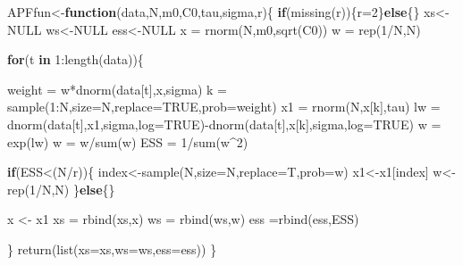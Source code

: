 \documentclass[
]{article}
\newenvironment{Shaded}{\begin{snugshade}}{\end{snugshade}}
\newcommand{\AttributeTok}[1]{\textcolor[rgb]{0.77,0.63,0.00}{#1}}
\newcommand{\ConstantTok}[1]{\textcolor[rgb]{0.00,0.00,0.00}{#1}}
\newcommand{\ControlFlowTok}[1]{\textcolor[rgb]{0.13,0.29,0.53}{\textbf{#1}}}
\newcommand{\DecValTok}[1]{\textcolor[rgb]{0.00,0.00,0.81}{#1}}
\newcommand{\FunctionTok}[1]{\textcolor[rgb]{0.00,0.00,0.00}{#1}}
\newcommand{\NormalTok}[1]{#1}
\newcommand{\OtherTok}[1]{\textcolor[rgb]{0.56,0.35,0.01}{#1}}
\newcommand{\SpecialCharTok}[1]{\textcolor[rgb]{0.00,0.00,0.00}{#1}}
\begin{document}
\begin{Shaded}
\begin{Highlighting}[]
\NormalTok{APFfun}\OtherTok{\textless{}{-}}\ControlFlowTok{function}\NormalTok{(data,N,m0,C0,tau,sigma,r)\{}
  \ControlFlowTok{if}\NormalTok{(}\FunctionTok{missing}\NormalTok{(r))\{r}\OtherTok{=}\DecValTok{2}\NormalTok{\}}\ControlFlowTok{else}\NormalTok{\{\}}
\NormalTok{  xs}\OtherTok{\textless{}{-}}\ConstantTok{NULL}
\NormalTok{  ws}\OtherTok{\textless{}{-}}\ConstantTok{NULL}
\NormalTok{  ess}\OtherTok{\textless{}{-}}\ConstantTok{NULL}
\NormalTok{  x  }\OtherTok{=} \FunctionTok{rnorm}\NormalTok{(N,m0,}\FunctionTok{sqrt}\NormalTok{(C0))}
\NormalTok{  w  }\OtherTok{=} \FunctionTok{rep}\NormalTok{(}\DecValTok{1}\SpecialCharTok{/}\NormalTok{N,N)}
  
  \ControlFlowTok{for}\NormalTok{(t }\ControlFlowTok{in} \DecValTok{1}\SpecialCharTok{:}\FunctionTok{length}\NormalTok{(data))\{}
    
\NormalTok{    weight }\OtherTok{=}\NormalTok{ w}\SpecialCharTok{*}\FunctionTok{dnorm}\NormalTok{(data[t],x,sigma)}
\NormalTok{    k   }\OtherTok{=} \FunctionTok{sample}\NormalTok{(}\DecValTok{1}\SpecialCharTok{:}\NormalTok{N,}\AttributeTok{size=}\NormalTok{N,}\AttributeTok{replace=}\ConstantTok{TRUE}\NormalTok{,}\AttributeTok{prob=}\NormalTok{weight)}
\NormalTok{    x1   }\OtherTok{=} \FunctionTok{rnorm}\NormalTok{(N,x[k],tau)}
\NormalTok{    lw  }\OtherTok{=} \FunctionTok{dnorm}\NormalTok{(data[t],x1,sigma,}\AttributeTok{log=}\ConstantTok{TRUE}\NormalTok{)}\SpecialCharTok{{-}}\FunctionTok{dnorm}\NormalTok{(data[t],x[k],sigma,}\AttributeTok{log=}\ConstantTok{TRUE}\NormalTok{)}
\NormalTok{    w   }\OtherTok{=} \FunctionTok{exp}\NormalTok{(lw)}
\NormalTok{    w   }\OtherTok{=}\NormalTok{ w}\SpecialCharTok{/}\FunctionTok{sum}\NormalTok{(w)}
\NormalTok{    ESS  }\OtherTok{=} \DecValTok{1}\SpecialCharTok{/}\FunctionTok{sum}\NormalTok{(w}\SpecialCharTok{\^{}}\DecValTok{2}\NormalTok{)}
    
    \ControlFlowTok{if}\NormalTok{(ESS}\SpecialCharTok{\textless{}}\NormalTok{(N}\SpecialCharTok{/}\NormalTok{r))\{}
\NormalTok{      index}\OtherTok{\textless{}{-}}\FunctionTok{sample}\NormalTok{(N,}\AttributeTok{size=}\NormalTok{N,}\AttributeTok{replace=}\NormalTok{T,}\AttributeTok{prob=}\NormalTok{w)}
\NormalTok{      x1}\OtherTok{\textless{}{-}}\NormalTok{x1[index]}
\NormalTok{      w}\OtherTok{\textless{}{-}}\FunctionTok{rep}\NormalTok{(}\DecValTok{1}\SpecialCharTok{/}\NormalTok{N,N)}
\NormalTok{    \}}\ControlFlowTok{else}\NormalTok{\{\}}
    
\NormalTok{    x }\OtherTok{\textless{}{-}}\NormalTok{ x1}
\NormalTok{    xs }\OtherTok{=} \FunctionTok{rbind}\NormalTok{(xs,x)}
\NormalTok{    ws }\OtherTok{=} \FunctionTok{rbind}\NormalTok{(ws,w)}
\NormalTok{    ess }\OtherTok{=}\FunctionTok{rbind}\NormalTok{(ess,ESS)}
    
\NormalTok{  \}}
  \FunctionTok{return}\NormalTok{(}\FunctionTok{list}\NormalTok{(}\AttributeTok{xs=}\NormalTok{xs,}\AttributeTok{ws=}\NormalTok{ws,}\AttributeTok{ess=}\NormalTok{ess))}
\NormalTok{\}}
\end{Highlighting}
\end{Shaded}
\end{document}
